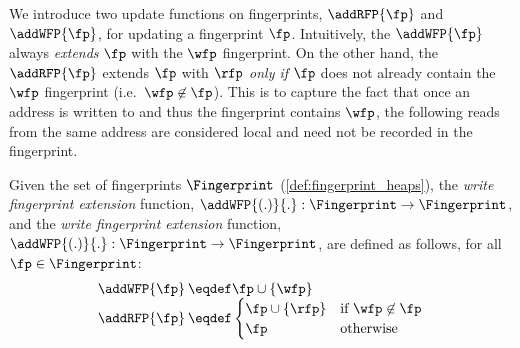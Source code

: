We introduce two update functions on fingerprints, $\addRFP{\fp}$ and $\addWFP{\fp}$, for updating a fingerprint $\fp$. Intuitively, the $\addWFP{\fp}$ always \emph{extends} $\fp$ with the $\wfp$ fingerprint. On the other hand, the $\addRFP{\fp}$ extends $\fp$ with $\rfp$ \emph{only if} $\fp$ does not already contain the $\wfp$ fingerprint (i.e.~$\wfp \not\in \fp$). This is to capture the fact that once an address is written to and thus the fingerprint contains $\wfp$, the following reads from the same address are considered local and need not be recorded in the fingerprint.
%
%
%
\begin{definition}
Given the set of fingerprints $\Fingerprint$ (\ref{def:fingerprint_heaps}), the \emph{write fingerprint extension} function, $\addWFP{(.)}{.}: \Fingerprint \rightarrow \Fingerprint$, and the \emph{write fingerprint extension} function, $\addWFP{(.)}{.}: \Fingerprint \rightarrow \Fingerprint$, are defined as follows, for all $\fp \in \Fingerprint$:
\[
\begin{array}{r @{\hspace{2pt}} l}
	\addWFP{\fp} & \eqdef \fp \cup \{\wfp\} \\
	\addRFP{\fp} & \eqdef
	\begin{cases}
		\fp \cup \{\rfp\}  & \text{if } \wfp \not\in \fp \\
		\fp & \text{otherwise}
	\end{cases}
\end{array}	
\]
\end{definition}

